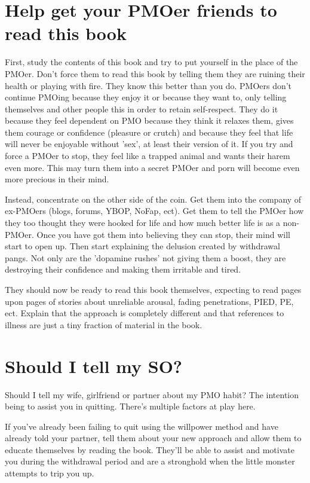 \documentclass[easypeasy.tex]{subfiles}
\begin{document}
\section{Help get your PMOer friends to read this book}

First, study the contents of this book and try to put yourself in the place of the PMOer. Don't force them to read this book by telling them they are ruining their health or playing with fire. They know this better than you do. PMOers don't continue PMOing because they enjoy it or because they want to, only telling themselves and other people this in order to retain self-respect. They do it because they feel dependent on PMO because they think it relaxes them, gives them courage or confidence (pleasure or crutch) and because they feel that life will never be enjoyable without 'sex', at least their version of it. If you try and force a PMOer to stop, they feel like a trapped animal and wants their harem even more. This may turn them into a secret PMOer and porn will become even more precious in their mind.

Instead, concentrate on the other side of the coin. Get them into the company of ex-PMOers (blogs, forums, YBOP, NoFap, ect). Get them to tell the PMOer how they too thought they were hooked for life and how much better life is as a non-PMOer. Once you have got them into believing they can stop, their mind will start to open up. Then start explaining the delusion created by withdrawal pangs. Not only are the 'dopamine rushes' not giving them a boost, they are destroying their confidence and making them irritable and tired.

They should now be ready to read this book themselves, expecting to read pages upon pages of stories about unreliable arousal, fading penetrations, PIED, PE, ect. Explain that the approach is completely different and that references to illness are just a tiny fraction of material in the book.

\section{Should I tell my SO?}

Should I tell my wife, girlfriend or partner about my PMO habit? The intention being to assist you in quitting. There's multiple factors at play here.

If you've already been failing to quit using the willpower method and have already told your partner, tell them about your new approach and allow them to educate themselves by reading the book. They'll be able to assist and motivate you during the withdrawal period and are a stronghold when the little monster attempts to trip you up.
\end{document}
